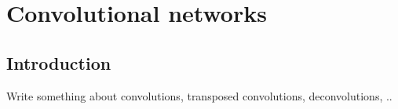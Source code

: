 \chapter{Convolutional networks}

\section{Introduction}\label{sec:i}
Write something about convolutions, transposed convolutions, deconvolutions, ..


